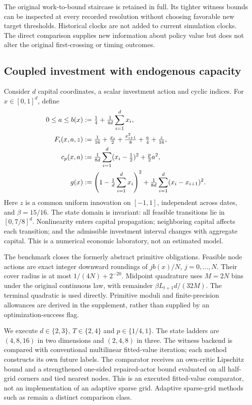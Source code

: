 The original work-to-bound staircase is retained in full. Its tighter witness bounds can be inspected at every recorded resolution without choosing favorable new target thresholds. Historical clocks are not added to current simulation clocks. The direct comparison supplies new information about policy value but does not alter the original first-crossing or timing outcomes.

\subsection{Coupled investment with endogenous capacity}
Consider $d$ capital coordinates, a scalar investment action and cyclic indices. For $x\in[0,1]^d$, define
\begin{align}\label{eq:model47}
 0\le a\le b(x)&:=\tfrac14+\tfrac1{4d}\sum_{i=1}^d x_i,\\
 F_i(x,a,z)&:=\tfrac1{16}+\tfrac{x_i}{2}+\tfrac{x_{i+1}^2}{8}
                         +\tfrac a4+\tfrac z{16},\notag\\
 c_p(x,a)&:=\tfrac1{8d}\sum_{i=1}^d(x_i-\tfrac12)^2+\tfrac p2a^2,\notag\\
 g(x)&:=\left(1-\tfrac1d\sum_{i=1}^dx_i\right)^2
                     +\tfrac1{8d}\sum_{i=1}^d(x_i-x_{i+1})^2.\notag
\end{align}
Here $z$ is a common uniform innovation on $[-1,1]$, independent across dates, and $\beta=15/16$. The state domain is invariant: all feasible transitions lie in $[0,7/8]^d$. Nonlinearity enters capital propagation; neighboring capital affects each transition; and the admissible investment interval changes with aggregate capital. This is a numerical economic laboratory, not an estimated model.

The benchmark closes the formerly abstract primitive obligations. Feasible node actions are exact integer downward roundings of $jb(x)/N$, $j=0,\ldots,N$. Their cover radius is at most $1/(4N)+2^{-20}$. Midpoint quadrature uses $M=2N$ bins under the original continuous law, with remainder $\beta L_{t+1}d/(32M)$. The terminal quadratic is used directly. Primitive moduli and finite-precision allowances are derived in the supplement, rather than supplied by an optimization-success flag.

We execute $d\in\{2,3\}$, $T\in\{2,4\}$ and $p\in\{1/4,1\}$. The state ladders are $(4,8,16)$ in two dimensions and $(2,4,8)$ in three. The witness backend is compared with conventional multilinear fitted-value iteration; each method constructs its own future labels. The comparator receives an own-critic Lipschitz bound and a strengthened one-sided repaired-actor bound evaluated on all half-grid corners and tied nearest nodes. This is an executed fitted-value comparator, not an implementation of an adaptive sparse grid. Adaptive sparse-grid methods such as \citet{brumm2017} remain a distinct comparison class.

